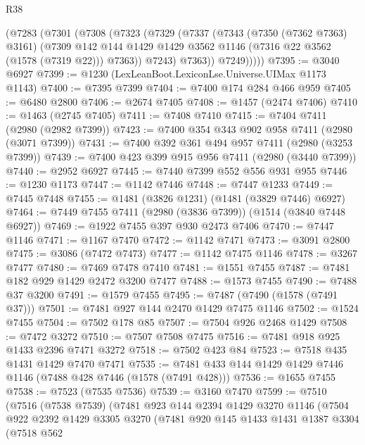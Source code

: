 \begin{lexlean}{R38}
\begin{coremodule}
        (@7283
          (@7301
            (@7308
              (@7323
                (@7329
                  (@7337
                    (@7343
                      (@7350 (@7362 @7363) @3161)
                      (@7309
                        @142
                        @144
                        @1429
                        @1429
                        @3562
                        @1146
                        (@7316 @22 @3562 (@1578 (@7319 @22)))
                        @7363))
                    @7243)
                  @7363))
              @7249)))))
@7395 := @3040 @6927
@7399 := @1230 (LexLeanBoot.LexiconLse.Universe.UIMax @1173 @1143)
@7400 := @7395 @7399
@7404 := @7400 @174 @284 @466 @959
@7405 := @6480 @2800
@7406 := @2674 @7405
@7408 := @1457 (@2474 @7406)
@7410 := @1463 (@2745 @7405)
@7411 := @7408 @7410
@7415 := @7404 @7411 (@2980 (@2982 @7399))
@7423 := @7400 @354 @343 @902 @958 @7411 (@2980 (@3071 @7399))
@7431 := @7400 @392 @361 @494 @957 @7411 (@2980 (@3253 @7399))
@7439 := @7400 @423 @399 @915 @956 @7411 (@2980 (@3440 @7399))
@7440 := @2952 @6927
@7445 := @7440 @7399 @552 @556 @931 @955
@7446 := @1230 @1173
@7447 := @1142 @7446
@7448 := @7447 @1233
@7449 := @7445 @7448
@7455 := @1481 (@3826 @1231) (@1481 (@3829 @7446) @6927)
@7464 := @7449 @7455 @7411 (@2980 (@3836 @7399)) (@1514 (@3840 @7448 @6927))
@7469 := @1922 @7455 @397 @930 @2473 @7406
@7470 := @7447 @1146
@7471 := @1167 @7470
@7472 := @1142 @7471
@7473 := @3091 @2800
@7475 := @3086 (@7472 @7473)
@7477 := @1142 @7475 @1146
@7478 := @3267 @7477
@7480 := @7469 @7478 @7410
@7481 := @1551 @7455
@7487 := @7481 @182 @929 @1429 @2472 @3200 @7477
@7488 := @1573 @7455
@7490 := @7488 @37 @3200
@7491 := @1579 @7455
@7495 := @7487 (@7490 (@1578 (@7491 @37)))
@7501 := @7481 @927 @144 @2470 @1429 @7475 @1146
@7502 := @1524 @7455
@7504 := @7502 @178 @85
@7507 := @7504 @926 @2468 @1429
@7508 := @7472 @3272
@7510 := @7507 @7508 @7475
@7516 := @7481 @918 @925 @1433 @2396 @7471 @3272
@7518 := @7502 @423 @84
@7523 := @7518 @435 @1431 @1429 @7470 @7471
@7535 := @7481 @433 @144 @1429 @1429 @7446 @1146 (@7488 @428 @7446 (@1578 (@7491 @428)))
@7536 := @1655 @7455
@7538 := @7523 (@7535 @7536)
@7539 := @3160 @7470
@7599 := @7510
    (@7516
      (@7538 @7539)
      (@7481
        @923
        @144
        @2394
        @1429
        @3270
        @1146
        (@7504
          @922
          @2392
          @1429
          @3305
          @3270
          (@7481
            @920
            @145
            @1433
            @1431
            @1387
            @3304
            (@7518
              @562

\end{coremodule}
\end{lexlean}

